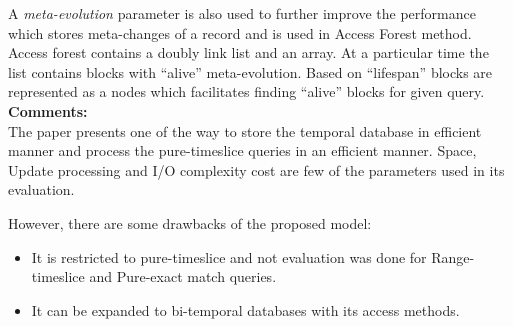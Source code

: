 \documentclass[a4paper,11pt, twoside]{article}
\begin{document}
A \emph{meta-evolution} parameter is also used to further improve the performance which stores meta-changes of a record and is used in Access Forest method. Access forest contains a doubly link list and an array. At a particular time the list contains blocks with ``alive'' meta-evolution. Based on ``lifespan'' blocks are represented as a nodes which facilitates finding ``alive'' blocks for given query.\\

  
\textbf{Comments:}\\
The paper presents one of the way to store the temporal database in efficient manner and process the pure-timeslice queries in an efficient manner. Space, Update processing and I/O complexity cost are few of the parameters used in its evaluation.

However, there are some drawbacks of the proposed model:
\begin{itemize}
	\item It is restricted to pure-timeslice and not evaluation was done for Range-timeslice and Pure-exact match queries.
	\item It can be expanded to bi-temporal databases with its access methods.
\end{itemize}
\end{document}
